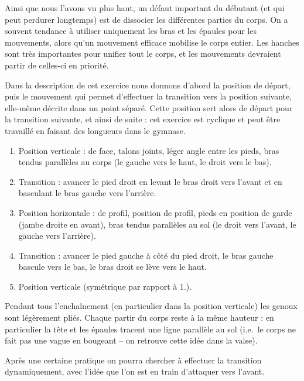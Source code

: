 Ainsi que nous l'avons vu plus haut, un défaut important du débutant (et qui peut perdurer longtemps) est de dissocier les différentes parties du corps.
On a souvent tendance à utiliser uniquement les bras et les épaules pour les mouvements, alors qu'un mouvement efficace mobilise le corps entier.
Les hanches sont très importantes pour unifier tout le corps, et les mouvements devraient partir de celles-ci en priorité.


\begin{exercice}
	\label{struc:ex:roue-avant}
	


	Dans la description de cet exercice nous donnons d'abord la position de départ, puis le mouvement qui permet d'effectuer la transition vers la position suivante, elle-même décrite dans un point séparé.
	Cette position sert alors de départ pour la transition suivante, et ainsi de suite : cet exercice est cyclique et peut être travaillé en faisant des longueurs dans le gymnase.

	\begin{enumerate}
		\item Position verticale : de face, talons joints, léger angle entre les pieds, bras tendus parallèles au corps (le gauche vers le haut, le droit vers le bas).
		
		\item Transition : avancer le pied droit en levant le bras droit vers l'avant et en basculant le bras gauche vers l'arrière.
		
		\item Position horizontale : de profil, position de profil, pieds en position de garde (jambe droite en avant), bras tendus parallèles au sol (le droit vers l'avant, le gauche vers l'arrière).
		
		\item Transition : avancer le pied gauche à côté du pied droit, le bras gauche bascule vers le bas, le bras droit se lève vers le haut.
		
		\item Position verticale (symétrique par rapport à 1.).
	\end{enumerate}

	Pendant tous l'enchaînement (en particulier dans la position verticale) les genoux sont légèrement pliés.
	Chaque partir du corps reste à la même hauteur : en particulier la tête et les épaules tracent une ligne parallèle au sol (i.e.\ le corps ne fait pas une vague en bougeant -- on retrouve cette idée dans la valse).

	Après une certaine pratique on pourra chercher à effectuer la transition dynamiquement, avec l'idée que l'on est en train d'attaquer vers l'avant.

\end{exercice}


